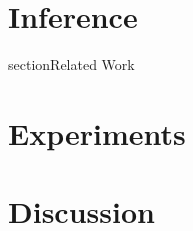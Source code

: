 \documentclass[11pt]{amsart}
\begin{document}
\section{Inference}
\label{sec:inference}

section{Related Work}

\label{sec:related_work} 


\section{Experiments}

\label{sec:experiments}

\section{Discussion}
\label{sec:discussion}


  


\end{document}
